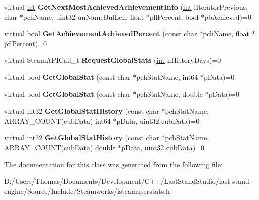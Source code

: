 \begin{DoxyCompactItemize}
\item 
\hypertarget{classISteamUserStats_ad34ffdd586272b6b029a94ceccdaf4c4}{}virtual \hyperlink{SDL__thread_8h_a6a64f9be4433e4de6e2f2f548cf3c08e}{int} {\bfseries Get\+Next\+Most\+Achieved\+Achievement\+Info} (\hyperlink{SDL__thread_8h_a6a64f9be4433e4de6e2f2f548cf3c08e}{int} i\+Iterator\+Previous, char $\ast$pch\+Name, uint32 un\+Name\+Buf\+Len, float $\ast$pfl\+Percent, bool $\ast$pb\+Achieved)=0\label{classISteamUserStats_ad34ffdd586272b6b029a94ceccdaf4c4}

\item 
\hypertarget{classISteamUserStats_aa823894f28563681fc564b0bbe1736d5}{}virtual bool {\bfseries Get\+Achievement\+Achieved\+Percent} (const char $\ast$pch\+Name, float $\ast$pfl\+Percent)=0\label{classISteamUserStats_aa823894f28563681fc564b0bbe1736d5}

\item 
\hypertarget{classISteamUserStats_a3d6507c31ba54fd58f20f00f28e15835}{}virtual Steam\+A\+P\+I\+Call\+\_\+t {\bfseries Request\+Global\+Stats} (\hyperlink{SDL__thread_8h_a6a64f9be4433e4de6e2f2f548cf3c08e}{int} n\+History\+Days)=0\label{classISteamUserStats_a3d6507c31ba54fd58f20f00f28e15835}

\item 
\hypertarget{classISteamUserStats_a0227aabee90c830b9e7cdce7fc27dd60}{}virtual bool {\bfseries Get\+Global\+Stat} (const char $\ast$pch\+Stat\+Name, int64 $\ast$p\+Data)=0\label{classISteamUserStats_a0227aabee90c830b9e7cdce7fc27dd60}

\item 
\hypertarget{classISteamUserStats_a45f8d4102d8bafa1ce12953eb28f58cc}{}virtual bool {\bfseries Get\+Global\+Stat} (const char $\ast$pch\+Stat\+Name, double $\ast$p\+Data)=0\label{classISteamUserStats_a45f8d4102d8bafa1ce12953eb28f58cc}

\item 
\hypertarget{classISteamUserStats_aaccd1cadd574fc89542f6f84e7794a3d}{}virtual int32 {\bfseries Get\+Global\+Stat\+History} (const char $\ast$pch\+Stat\+Name, A\+R\+R\+A\+Y\+\_\+\+C\+O\+U\+N\+T(cub\+Data) int64 $\ast$p\+Data, uint32 cub\+Data)=0\label{classISteamUserStats_aaccd1cadd574fc89542f6f84e7794a3d}

\item 
\hypertarget{classISteamUserStats_ac2b6f77ebc841f39624c097f811f4aae}{}virtual int32 {\bfseries Get\+Global\+Stat\+History} (const char $\ast$pch\+Stat\+Name, A\+R\+R\+A\+Y\+\_\+\+C\+O\+U\+N\+T(cub\+Data) double $\ast$p\+Data, uint32 cub\+Data)=0\label{classISteamUserStats_ac2b6f77ebc841f39624c097f811f4aae}

\end{DoxyCompactItemize}


The documentation for this class was generated from the following file\+:\begin{DoxyCompactItemize}
\item 
D\+:/\+Users/\+Thomas/\+Documents/\+Development/\+C++/\+Last\+Stand\+Studio/last-\/stand-\/engine/\+Source/\+Include/\+Steamworks/isteamuserstats.\+h\end{DoxyCompactItemize}

